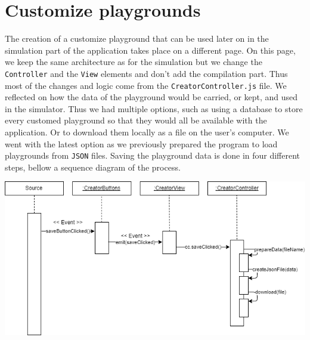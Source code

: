 \documentclass{scrbook}
\begin{document}
\section{Customize playgrounds}

The creation of a customize playground that can be used later on in the simulation part of the application takes place on a different page. On this page, we keep the same architecture as for the simulation but we change the \texttt{Controller} and the \texttt{View} elements 
and don't add the compilation part. Thus most of the changes and logic come from the \texttt{CreatorController.js} file. We reflected  on how the data of the playground would be carried, or kept, and used in the simulator. Thus we had multiple options,
such as using a database to store every customed playground so that they would all be available with the application. Or to download  them locally as a file on the user's computer. We went with the latest option as we previously prepared the program to load playgrounds from \texttt{JSON} files.
Saving the playground data is done in four different steps, bellow a sequence diagram of the process.
\begin{center}
  \includegraphics[width=\textwidth]{./savepg_sd}
\end{center}
\end{document}
